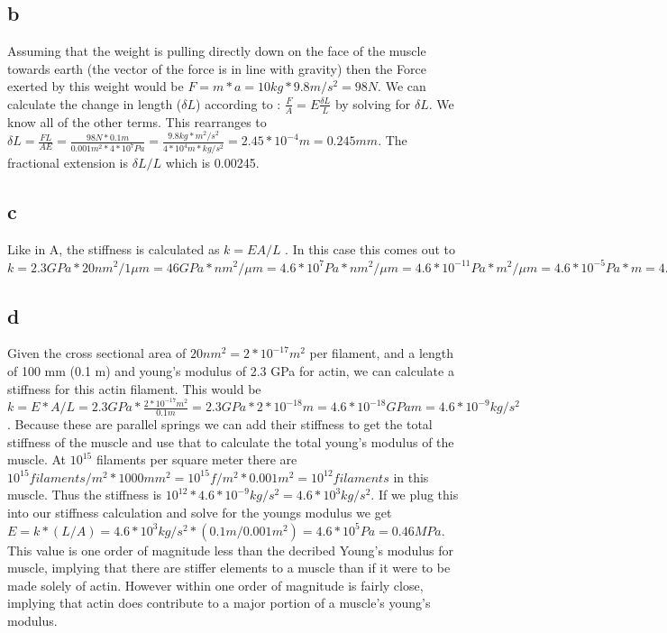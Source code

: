 \documentclass[12pt]{article}
\begin{document}
\subsection{b}
Assuming that the weight is pulling directly down on the face of the muscle towards earth (the vector of the force is in line with gravity) then the Force exerted by this weight would be $F = m*a = 10 kg * 9.8 m/s^2 = 98 N$. We can calculate the change in length ($\delta L$) according to : $\frac{F}{A} = E\frac{\delta L}{L}$ by solving for $\delta L$. We know all of the other terms. This rearranges to $\delta L = \frac{FL}{AE} = \frac{98 N*0.1 m}{0.001 m^2 * 4*10^7 Pa} =   \frac{9.8 kg*m^2 / s^2}{ 4*10^4 m*kg/s^2} = 2.45*10^{-4}m = 0.245 mm$. The fractional extension is $\delta L/L$ which is 0.00245.

\subsection{c}
Like in A, the stiffness is calculated as $k = {EA}/L$ . In this case this comes out to $k = 2.3GPa*20 nm^2 / 1 \mu m = 46 GPa*nm^2/\mu  m = 4.6*10^7 Pa*nm^2/\mu  m = 4.6*10^{-11}Pa*m^2/\mu  m = 4.6*10^{-5}Pa*m = 4.6*10^{-5} kg/s^2$

\subsection{d}
Given the cross sectional area of $20 nm^2 = 2*10^{-17}m^2$ per filament, and a length of 100 mm (0.1 m) and young's modulus of 2.3 GPa for actin, we can calculate a stiffness for this actin filament. This would be $k = E * A/L = 2.3 GPa * \frac{2*10^{-17}m^2}{0.1m} = 2.3 GPa * 2*10^{-18}m = 4.6*10^{-18} GPa m = 4.6*10^{-9} kg/s^2 $. Because these are parallel springs we can add their stiffness to get the total stiffness of the muscle and use that to calculate the total young's modulus of the muscle. At $10^{15}$ filaments per square meter there are $10^{15} filaments/m^2 * 1000 mm^2 = 10^{15} f/m^2 * 0.001 m^2 = 10^{12} filaments$ in this muscle. Thus the stiffness is $10^{12} * 4.6*10^{-9}kg/s^2 = 4.6*10^3kg/s^2$. If we plug this into our stiffness calculation and solve for the youngs modulus we get $E = k*(L/A) = 4.6*10^3 kg/s^2 *(0.1 m/ 0.001 m^2) = 4.6*10^5 Pa = 0.46 MPa$. This value is one order of magnitude less than the decribed Young's modulus for muscle, implying that there are stiffer elements to a muscle than if it were to be made solely of actin. However within one order of magnitude is fairly close, implying that actin does contribute to a major portion of a muscle's young's modulus.
\end{document}
